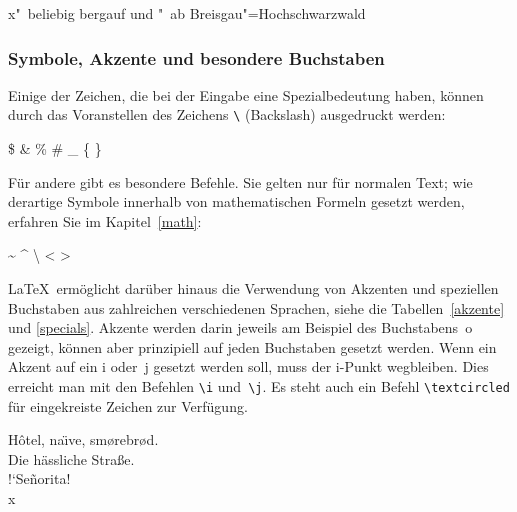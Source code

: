 \begin{LTXexample}[firstline=2]
\obeylines
x"~beliebig
bergauf und "~ab
Breisgau"=Hochschwarzwald
\end{LTXexample}


\subsubsection{Symbole, Akzente und besondere Buchstaben}\label{symbole}

Einige der Zeichen, die bei der Eingabe eine Spezialbedeutung haben,
können durch das Voranstellen des
Zeichens \lstinline|\| (Backslash) ausgedruckt werden:
\begin{LTXexample}
\$ \& \% \# \_ \{ \}
\end{LTXexample}
Für andere gibt es besondere Befehle.  Sie gelten nur für normalen
Text; wie derartige Symbole innerhalb von mathematischen
Formeln gesetzt werden, erfahren Sie im Kapitel~\ref{math}:
\begin{LTXexample}[firstline=2]
\obeylines
\textasciitilde
\textasciicircum
\textbackslash 
\textbar  
\textless  
\textgreater
\end{LTXexample}

\LaTeX\ ermöglicht darüber hinaus die Verwendung von Akzenten 
und speziellen Buchstaben aus zahlreichen verschiedenen Sprachen, 
siehe die Tabellen~\ref{akzente}  und \ref{specials}.
Akzente werden darin jeweils am Beispiel
des Buchstabens~o gezeigt, können aber prinzipiell auf jeden
Buchstaben gesetzt werden.
Wenn ein Akzent auf ein i oder~j gesetzt werden soll, muss der
\mbox{i-Punkt} wegbleiben. Dies erreicht man mit den Befehlen
\lstinline|\i| und~\lstinline|\j|.
Es steht auch ein Befehl \lstinline|\textcircled| für 
eingekreiste Zeichen zur Verfügung.

\begin{LTXexample}
H\^otel, na\"\i ve, sm\o rebr\o d. \\
Die h\"assliche Stra\ss{}e.\\
!`Se\~norita!\\
\textcircled{x}
\end{LTXexample}


